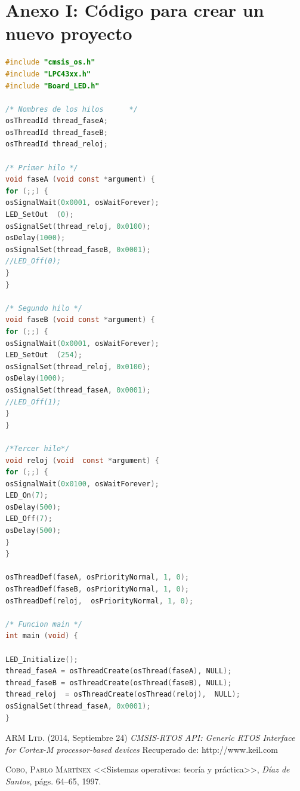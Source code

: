 \documentclass[12pt, twoside]{report}
\begin{document}
\appendix
\renewcommand{\appendixname}{Anexos}
\renewcommand{\appendixtocname}{Anexos}
\renewcommand{\appendixpagename}{Anexos}
\clearpage
\addappheadtotoc
\appendixpage
\chapter{Anexo I: Código para crear un nuevo proyecto}

\begin{lstlisting}[language=C]
#include "cmsis_os.h"
#include "LPC43xx.h"
#include "Board_LED.h"

/* Nombres de los hilos      */
osThreadId thread_faseA;                  
osThreadId thread_faseB;                 
osThreadId thread_reloj;                   

/* Primer hilo */
void faseA (void const *argument) {
for (;;) {
osSignalWait(0x0001, osWaitForever);
LED_SetOut	(0);
osSignalSet(thread_reloj, 0x0100);
osDelay(1000);
osSignalSet(thread_faseB, 0x0001);
//LED_Off(0);
}
}

/* Segundo hilo */
void faseB (void const *argument) {
for (;;) {
osSignalWait(0x0001, osWaitForever);
LED_SetOut	(254);
osSignalSet(thread_reloj, 0x0100);
osDelay(1000);
osSignalSet(thread_faseA, 0x0001);
//LED_Off(1);
}
}

/*Tercer hilo*/
void reloj (void  const *argument) {
for (;;) {
osSignalWait(0x0100, osWaitForever);  
LED_On(7);
osDelay(500);
LED_Off(7);
osDelay(500);
}
}

osThreadDef(faseA, osPriorityNormal, 1, 0);
osThreadDef(faseB, osPriorityNormal, 1, 0);
osThreadDef(reloj,  osPriorityNormal, 1, 0);

/* Funcion main */
int main (void) {

LED_Initialize();
thread_faseA = osThreadCreate(osThread(faseA), NULL);
thread_faseB = osThreadCreate(osThread(faseB), NULL);
thread_reloj  = osThreadCreate(osThread(reloj),  NULL);
osSignalSet(thread_faseA, 0x0001);
}

\end{lstlisting}

\begin{thebibliography}{X}
	 \textsc{ARM Ltd.}%
	(2014, Septiembre 24)
	\textit{CMSIS-RTOS API: Generic RTOS Interface for Cortex-M processor-based devices}
	Recuperado de: http://www.keil.com
	
	 \textsc{Cobo, Pablo Martínex} %
	<<Sistemas operativos: teoría y práctica>>,
	\textit{Díaz de Santos}, %
	págs. 64--65, 1997.
\end{thebibliography}
\end{document}
